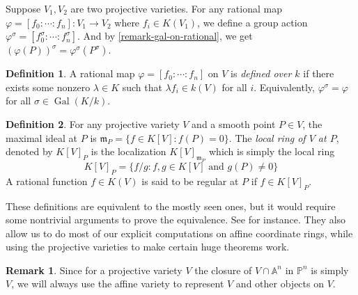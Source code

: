 \documentclass[12pt]{article}
\theoremstyle{remark}
\theoremstyle{definition}
\newtheorem{remark}{Remark}[subsection]
\newtheorem{definition}{Definition}[subsection]
\newcommand{\s}[0]{\sigma}
\newcommand{\A}[0]{\mathbb{A}}
\newcommand{\Pc}{\mathbb{P}}   %
\newcommand{\Gal}[0]{\operatorname{Gal}}
\begin{document}
        Suppose $V_1, V_2$ are two projective varieties. For any rational map $\varphi=[f_0:\cdots:f_n]:V_1\to V_2$ where $f_i\in K(V_1)$, we define a group action $\varphi^\s=[f_0^\s:\cdots:f_n^\s]$. And by \autoref{remark-gal-on-rational}, we get $(\varphi(P))^\s=\varphi^\s(P^\s)$.
        \begin{definition}
            A rational map $\varphi=[f_0:\cdots:f_n]$ on $V$ is \textit{defined over $k$} if there exists some nonzero $\lambda\in K$ such that $\lambda f_i\in k(V)$ for all $i$. Equivalently, $\varphi^\s=\varphi$ for all $\s\in\Gal(K/k)$.
        \end{definition}
        \begin{definition}
            For any projective variety $V$ and a smooth point $P\in V$, the maximal ideal at $P$ is $\mathfrak m_P=\{f\in K[V]:f(P)=0\}$. The \textit{local ring of $V$ at $P$}, denoted by $K[V]_P$ is the localization $K[V]_{\mathfrak m_P}$ which is simply the local ring
            \[K[V]_P=\{f/g:f, g\in K[V]\text{ and } g(P)\neq 0\}\]
            A rational function $f\in K(V)$ is said to be regular at $P$ if $f\in K[V]_P$.
        \end{definition}
        \noindent These definitions are equivalent to the mostly seen ones, but it would require some nontrivial arguments to prove the equivalence. See \cite{hartshorne_2010_algebraic} for instance. They also allow us to do most of our explicit computations on affine coordinate rings, while using the projective varieties to make certain huge theorems work.
        \begin{remark}
            Since for a projective variety $V$ the closure of $V\cap \A^n$ in $\Pc^n$ is simply $V$, we will always use the affine variety to represent $V$ and other objects on $V$.
        \end{remark}
        
        
        
        
\end{document}
